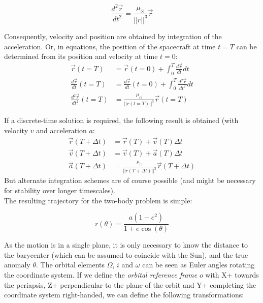 \documentclass[a4paper,10pt]{article}
\begin{document}
\begin{equation}
 \frac{d^2 \vec{r}}{dt^2} = \frac{\mu_\odot}{||r||^3}\vec{r}
\end{equation}

Consequently, velocity and position are obtained by integration of the acceleration. Or, in equations, the position of the spacecraft at time $t=T$ can be determined from its position and velocity at time $t=0$:
\begin{align}
\vec{r}(t=T) &= \vec{r}(t=0) + \int_0^T \frac{d \vec{r}}{dt} dt \\
\frac{d \vec{r}}{dt}(t=T) &= \frac{d \vec{r}}{dt}(t=0) + \int_0^T \frac{d^2 \vec{r}}{dt^2} dt \\
\frac{d^2 \vec{r}}{dt^2}(t=T) &= \frac{\mu_\odot}{||r(t=T)||^3}\vec{r}(t=T)
\end{align}

If a discrete-time solution is required, the following result is obtained (with velocity $v$ and acceleration $a$:
\begin{align}
 \vec{r}(T+\Delta t) &= \vec{r}(T) + \vec{v}(T)\Delta t \\
 \vec{v}(T+\Delta t) &= \vec{v}(T) + \vec{a}(T)\Delta t \\
 \vec{a}(T+\Delta t) &= \frac{\mu_\odot}{||r(T+\Delta t)||^3}\vec{r}(T + \Delta t)
\end{align}
But alternate integration schemes are of course possible (and might be necessary for stability over longer timescales).\\

The resulting trajectory for the two-body problem is simple:

\begin{equation}
 r(\theta) = \frac{a(1-e^2)}{1+e \cos (\theta)}
\end{equation}

As the motion is in a single plane, it is only necessary to know the distance to the barycenter (which can be assumed to coincide with the Sun), and the true anomaly $\theta$. The orbital elements $\Omega$, $i$ and $\omega$ can be seen as Euler angles rotating the coordinate system. If we define the \textit{orbital reference frame} $o$ with X+ towards the periapsis, Z+ perpendicular to the plane of the orbit and Y+ completing the coordinate system right-handed, we can define the following transformations:
\end{document}
